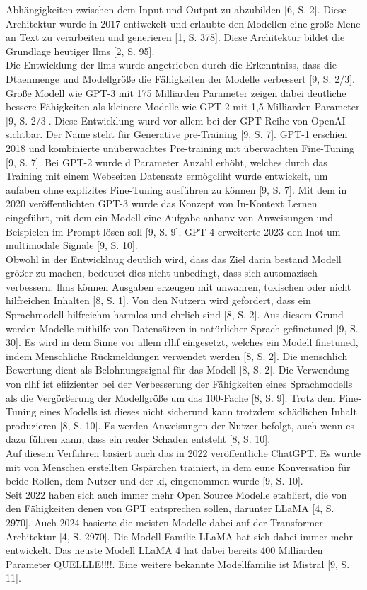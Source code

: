 Abhängigkeiten zwischen dem Input und Output zu abzubilden [6, S. 2]. Diese Architektur wurde in 2017 entiwckelt und erlaubte den Modellen 
eine große Mene an Text zu verarbeiten und generieren [1, S. 378]. Diese Architektur bildet die Grundlage heutiger \acp{llm} [2, S. 95]. \\
Die Entwicklung der \acp{llm} wurde angetrieben durch die Erkenntniss, dass die Dtaenmenge und Modellgröße die Fähigkeiten der Modelle verbessert [9, S. 2/3].
Große Modell wie GPT-3 mit 175 Milliarden Parameter zeigen dabei deutliche bessere Fähigkeiten als kleinere Modelle wie GPT-2 mit 1,5 Milliarden Parameter [9, S. 2/3].
Diese Entwicklung wurd vor allem bei der GPT-Reihe von OpenAI sichtbar. Der Name steht für Generative pre-Training [9, S. 7]. GPT-1 erschien 2018 und kombinierte
unüberwachtes Pre-training mit überwachten Fine-Tuning [9, S. 7]. Bei GPT-2 wurde d Parameter Anzahl erhöht, welches durch das Training mit einem
Webseiten Datensatz ermögcliht wurde entwickelt, um aufaben ohne explizites Fine-Tuning ausführen zu können [9, S. 7]. Mit dem in 2020 veröffentlichten GPT-3
wurde das Konzept von In-Kontext Lernen eingeführt, mit dem ein Modell eine Aufgabe anhanv von Anweisungen und Beispielen im Prompt lösen soll [9, S. 9]. GPT-4
erweiterte 2023 den Inot um multimodale Signale [9, S. 10]. \\
Obwohl in der Entwicklnug deutlich wird, dass das Ziel darin bestand Modell größer zu machen, bedeutet dies nicht unbedingt, dass sich automazisch verbessern. 
\acp{llm} können Ausgaben erzeugen mit unwahren, toxischen oder nicht hilfreichen Inhalten [8, S. 1]. Von den Nutzern wird gefordert, dass ein Sprachmodell 
hilfreichm harmlos und ehrlich sind [8, S. 2]. Aus diesem Grund werden Modelle mithilfe von Datensätzen in natürlicher Sprach gefinetuned [9, S. 30]. Es wird in 
dem Sinne vor allem \ac{rlhf} eingesetzt, welches ein Modell finetuned, indem Menschliche Rückmeldungen verwendet werden [8, S. 2]. Die menschlich 
Bewertung dient als Belohnungssignal für das Modell [8, S. 2]. Die Verwendung von \ac{rlhf} ist efiizienter bei der Verbesserung der Fähigkeiten eines Sprachmodells
als die Vergörßerung der Modellgröße um das 100-Fache [8, S. 9]. Trotz dem Fine-Tuning eines Modells ist dieses nicht sicherund kann trotzdem schädlichen Inhalt
produzieren [8, S. 10]. Es werden Anweisungen der Nutzer befolgt, auch wenn es dazu führen kann, dass ein realer Schaden entsteht [8, S. 10]. \\
Auf diesem Verfahren basiert auch das in 2022 veröffentliche ChatGPT. Es wurde mit von Menschen erstellten Gspärchen trainiert, in dem eune Konversation für beide
Rollen, dem Nutzer und der \ac{ki}, eingenommen wurde [9, S. 10]. \\ 
Seit 2022 haben sich auch immer mehr Open Source Modelle etabliert, die von den Fähigkeiten denen von GPT entsprechen sollen, darunter LLaMA [4, S. 2970]. Auch 
2024 basierte die meisten Modelle dabei auf der Transformer Architektur [4, S. 2970]. Die Modell Familie LLaMA hat sich dabei immer mehr entwickelt. Das neuste
Modell LLaMA 4 hat dabei bereits 400 Milliarden Parameter QUELLLE!!!!. Eine weitere bekannte Modellfamilie ist Mistral [9, S. 11]. 

